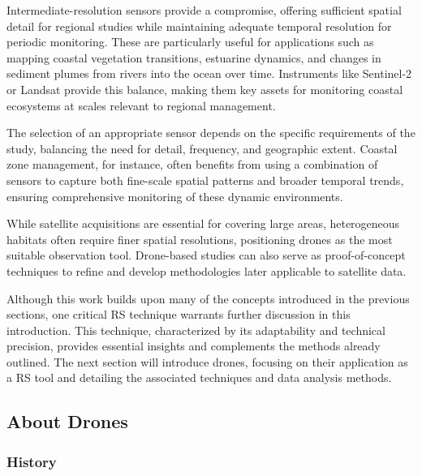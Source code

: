 \documentclass[
  letterpaper,
  11pt,
  english,
  singlespacing,
  headsepline]{MastersDoctoralThesis}
\begin{document}
\begin{spacing}{1.5}
Intermediate-resolution sensors provide a compromise, offering
sufficient spatial detail for regional studies while maintaining
adequate temporal resolution for periodic monitoring. These are
particularly useful for applications such as mapping coastal vegetation
transitions, estuarine dynamics, and changes in sediment plumes from
rivers into the ocean over time. Instruments like Sentinel-2 or Landsat
provide this balance, making them key assets for monitoring coastal
ecosystems at scales relevant to regional management.

The selection of an appropriate sensor depends on the specific
requirements of the study, balancing the need for detail, frequency, and
geographic extent. Coastal zone management, for instance, often benefits
from using a combination of sensors to capture both fine-scale spatial
patterns and broader temporal trends, ensuring comprehensive monitoring
of these dynamic environments.

While satellite acquisitions are essential for covering large areas,
heterogeneous habitats often require finer spatial resolutions,
positioning drones as the most suitable observation tool. Drone-based
studies can also serve as proof-of-concept techniques to refine and
develop methodologies later applicable to satellite data.

\begin{tcolorbox}
Although this work builds upon many of the concepts introduced in the previous sections, one critical RS technique warrants further discussion in this introduction. This technique, characterized by its adaptability and technical precision, provides essential insights and complements the methods already outlined. The next section will introduce drones, focusing on their application as a RS tool and detailing the associated techniques and data analysis methods.
\end{tcolorbox}

\subsection{About Drones}\label{about-drones}

\subsubsection{History}\label{history}


\end{spacing}
\end{document}
